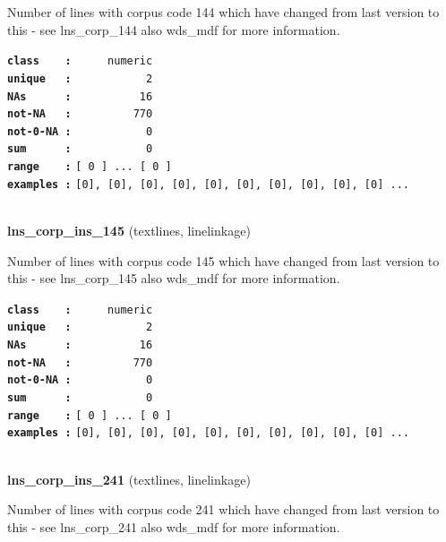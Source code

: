 \documentclass[]{article}
\begin{document}
Number of lines with corpus code 144 which have changed from last
version to this - see lns\_corp\_144 also wds\_mdf for more information.

\textbf{\texttt{class\ \ \ \ :}} \texttt{~~~~~numeric}\\
\textbf{\texttt{unique\ \ \ :}} \texttt{~~~~~~~~~~~2}\\
\textbf{\texttt{NAs\ \ \ \ \ \ :}} \texttt{~~~~~~~~~~16}\\
\textbf{\texttt{not-NA\ \ \ :}} \texttt{~~~~~~~~~770}\\
\textbf{\texttt{not-0-NA\ :}} \texttt{~~~~~~~~~~~0}\\
\textbf{\texttt{sum\ \ \ \ \ \ :}} \texttt{~~~~~~~~~~~0}\\
\textbf{\texttt{range\ \ \ \ :}}
\texttt{{[}\ 0\ {]}\ ...\ {[}\ 0\ {]}}\\
\textbf{\texttt{examples\ :}}
\texttt{{[}0{]},\ {[}0{]},\ {[}0{]},\ {[}0{]},\ {[}0{]},\ {[}0{]},\ {[}0{]},\ {[}0{]},\ {[}0{]},\ {[}0{]}\ ...}\\

~

\textbf{lns\_corp\_ins\_145} (textlines, linelinkage)

Number of lines with corpus code 145 which have changed from last
version to this - see lns\_corp\_145 also wds\_mdf for more information.

\textbf{\texttt{class\ \ \ \ :}} \texttt{~~~~~numeric}\\
\textbf{\texttt{unique\ \ \ :}} \texttt{~~~~~~~~~~~2}\\
\textbf{\texttt{NAs\ \ \ \ \ \ :}} \texttt{~~~~~~~~~~16}\\
\textbf{\texttt{not-NA\ \ \ :}} \texttt{~~~~~~~~~770}\\
\textbf{\texttt{not-0-NA\ :}} \texttt{~~~~~~~~~~~0}\\
\textbf{\texttt{sum\ \ \ \ \ \ :}} \texttt{~~~~~~~~~~~0}\\
\textbf{\texttt{range\ \ \ \ :}}
\texttt{{[}\ 0\ {]}\ ...\ {[}\ 0\ {]}}\\
\textbf{\texttt{examples\ :}}
\texttt{{[}0{]},\ {[}0{]},\ {[}0{]},\ {[}0{]},\ {[}0{]},\ {[}0{]},\ {[}0{]},\ {[}0{]},\ {[}0{]},\ {[}0{]}\ ...}\\

~

\textbf{lns\_corp\_ins\_241} (textlines, linelinkage)

Number of lines with corpus code 241 which have changed from last
version to this - see lns\_corp\_241 also wds\_mdf for more information.
\end{document}
